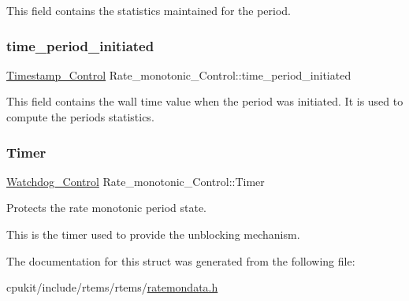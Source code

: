 This field contains the statistics maintained for the period. \mbox{\label{structRate__monotonic__Control_a3157757fefd869eae191df4b9c77507e}} 
\subsubsection{\texorpdfstring{time\_period\_initiated}{time\_period\_initiated}}
{\footnotesize\ttfamily \mbox{\hyperlink{group__SuperCoreTimeStamp_ga8508036506d5211c98844c88045e2410}{Timestamp\+\_\+\+Control}} Rate\+\_\+monotonic\+\_\+\+Control\+::time\+\_\+period\+\_\+initiated}

This field contains the wall time value when the period was initiated. It is used to compute the period\textquotesingle{}s statistics. \mbox{\label{structRate__monotonic__Control_a4bdcf4d867dc6a8395c7da359e2a559d}} 
\subsubsection{\texorpdfstring{Timer}{Timer}}
{\footnotesize\ttfamily \mbox{\hyperlink{structWatchdog__Control}{Watchdog\+\_\+\+Control}} Rate\+\_\+monotonic\+\_\+\+Control\+::\+Timer}



Protects the rate monotonic period state. 

This is the timer used to provide the unblocking mechanism. 

The documentation for this struct was generated from the following file\+:\begin{DoxyCompactItemize}
\item 
cpukit/include/rtems/rtems/\mbox{\hyperlink{ratemondata_8h}{ratemondata.\+h}}\end{DoxyCompactItemize}
